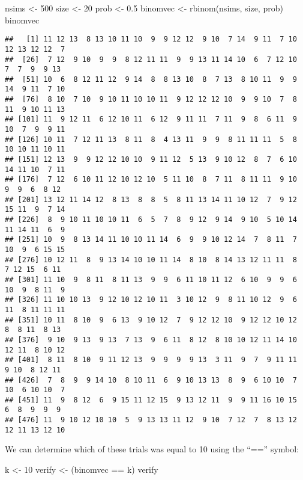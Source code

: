 \documentclass[
]{book}
\newenvironment{Shaded}{\begin{snugshade}}{\end{snugshade}}
\newcommand{\DecValTok}[1]{\textcolor[rgb]{0.00,0.00,0.81}{#1}}
\newcommand{\FloatTok}[1]{\textcolor[rgb]{0.00,0.00,0.81}{#1}}
\newcommand{\FunctionTok}[1]{\textcolor[rgb]{0.00,0.00,0.00}{#1}}
\newcommand{\NormalTok}[1]{#1}
\newcommand{\OtherTok}[1]{\textcolor[rgb]{0.56,0.35,0.01}{#1}}
\newcommand{\SpecialCharTok}[1]{\textcolor[rgb]{0.00,0.00,0.00}{#1}}
\begin{document}
\begin{Shaded}
\begin{Highlighting}[]
\NormalTok{nsims }\OtherTok{\textless{}{-}} \DecValTok{500}
\NormalTok{size }\OtherTok{\textless{}{-}} \DecValTok{20}
\NormalTok{prob }\OtherTok{\textless{}{-}} \FloatTok{0.5}
\NormalTok{binomvec }\OtherTok{\textless{}{-}} \FunctionTok{rbinom}\NormalTok{(nsims, size, prob)}
\NormalTok{binomvec}
\end{Highlighting}
\end{Shaded}

\begin{verbatim}
##   [1] 11 12 13  8 13 10 11 10  9  9 12 12  9 10  7 14  9 11  7 10 12 13 12 12  7
##  [26]  7 12  9 10  9  9  8 12 11 11  9  9 13 11 14 10  6  7 12 10  7  7  9  9 13
##  [51] 10  6  8 12 11 12  9 14  8  8 13 10  8  7 13  8 10 11  9  9 14  9 11  7 10
##  [76]  8 10  7 10  9 10 11 10 10 11  9 12 12 12 10  9  9 10  7  8 11  9 10 11 13
## [101] 11  9 12 11  6 12 10 11  6 12  9 11 11  7 11  9  8  6 11  9 10  7  9  9 11
## [126] 10 11  7 12 11 13  8 11  8  4 13 11  9  9  8 11 11 11  5  8 10 10 11 10 11
## [151] 12 13  9  9 12 12 10 10  9 11 12  5 13  9 10 12  8  7  6 10 14 11 10  7 11
## [176]  7 12  6 10 11 12 10 12 10  5 11 10  8  7 11  8 11 11  9 10  9  9  6  8 12
## [201] 13 12 11 14 12  8 13  8  8  5  8 11 13 14 11 10 12  7  9 12 15 11  9  7 14
## [226]  8  9 10 11 10 10 11  6  5  7  8  9 12  9 14  9 10  5 10 14 11 14 11  6  9
## [251] 10  9  8 13 14 11 10 10 11 14  6  9  9 10 12 14  7  8 11  7 10  9  6 15 15
## [276] 10 12 11  8  9 13 14 10 10 11 14  8 10  8 14 13 12 11 11  8  7 12 15  6 11
## [301] 11 10  9  8 11  8 11 13  9  9  6 11 10 11 12  6 10  9  9  6 10  9  8 11  9
## [326] 11 10 10 13  9 12 10 12 10 11  3 10 12  9  8 11 10 12  9  6 11  8 11 11 11
## [351] 10 11  8 10  9  6 13  9 10 12  7  9 12 12 10  9 12 12 10 12  8  8 11  8 13
## [376]  9 10  9 13  9 13  7 13  9  6 11  8 12  8 10 10 12 11 14 10 12 11  8 10 12
## [401]  8 11  8 10  9 11 12 13  9  9  9  9 13  3 11  9  7  9 11 11  9 10  8 12 11
## [426]  7  8  9  9 14 10  8 10 11  6  9 10 13 13  8  9  6 10 10  7 10  6 10 10  7
## [451] 11  9  8 12  6  9 15 11 12 15  9 13 12 11  9  9 11 16 10 15  6  8  9  9  9
## [476] 11  9 10 12 10 10  5  9 13 13 11 12  9 10  7 12  7  8 13 12 12 11 13 12 10
\end{verbatim}

We can determine which of these trials was equal to 10 using the ``=='' symbol:

\begin{Shaded}
\begin{Highlighting}[]
\NormalTok{k }\OtherTok{\textless{}{-}} \DecValTok{10}
\NormalTok{verify }\OtherTok{\textless{}{-}}\NormalTok{ (binomvec }\SpecialCharTok{==}\NormalTok{ k)}
\NormalTok{verify}
\end{Highlighting}
\end{Shaded}
\end{document}
